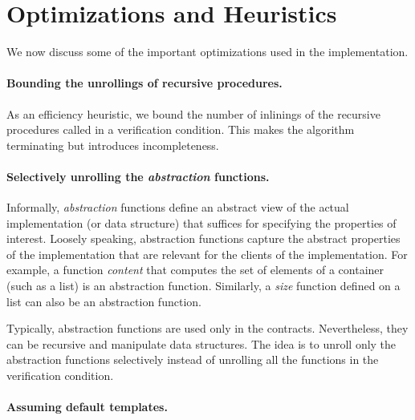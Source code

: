 \documentclass[a4paper,10pt]{article}
\begin{document}
\section{Optimizations and Heuristics} 

We now discuss some of the important optimizations  used in the implementation.

\paragraph{Bounding the unrollings of recursive procedures.}

As an efficiency heuristic, we bound the number of inlinings of the recursive procedures 
called in a verification condition. This makes the algorithm terminating but introduces incompleteness.

\paragraph{Selectively unrolling the \emph{abstraction} functions.}

Informally, \emph{abstraction} functions define an abstract view of the actual 
implementation (or data structure) that suffices for specifying the properties of interest.
Loosely speaking, abstraction functions capture the abstract properties of the implementation 
that are relevant for the clients of the implementation.
For example, a function \emph{content} that computes the set of elements of a container (such as a list)
is an abstraction function. Similarly, a \emph{size} function defined on a list can also be 
an abstraction function.

Typically, abstraction functions are used only in the contracts. Nevertheless, they can be 
recursive and manipulate data structures. The idea is to unroll only the abstraction functions
selectively instead of unrolling all the functions in the verification condition.


\paragraph{Assuming default templates.}
\end{document}
